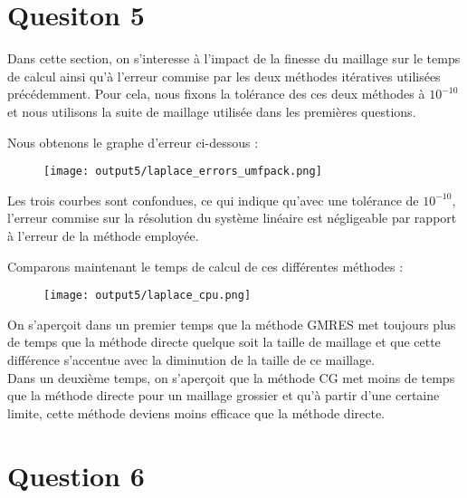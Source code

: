\documentclass[11pt,a4paper]{report}
\begin{document}
			\section*{Quesiton 5}
				
				Dans cette section, on s'interesse à l'impact de la finesse du maillage sur le temps de calcul ainsi qu'à l'erreur commise par les deux méthodes itératives utilisées précédemment.
				Pour cela, nous fixons la tolérance des ces deux méthodes à $10^{-10}$ et nous utilisons la suite de maillage utilisée dans les premières questions.

				Nous obtenons le graphe d'erreur ci-dessous :

				\begin{figure}[H]
					\centering
					\texttt{[image: output5/laplace\_errors\_umfpack.png]}
				\end{figure}

				Les trois courbes sont confondues, ce qui indique qu'avec une tolérance de $10^{-10}$, l'erreur commise sur la résolution du système linéaire est négligeable par rapport à l'erreur de la méthode employée.

				Comparons maintenant le temps de calcul de ces différentes méthodes :
				
				\begin{figure}[H]
					\centering
					\texttt{[image: output5/laplace\_cpu.png]}
				\end{figure}

				On s'aperçoit dans un premier temps que la méthode GMRES met toujours plus de temps que la méthode directe quelque soit la taille de maillage et que cette différence s'accentue avec la diminution de la taille de ce maillage.\\
				
				Dans un deuxième temps, on s'aperçoit que la méthode CG met moins de temps que la méthode directe pour un maillage grossier et qu'à partir d'une certaine limite, cette méthode deviens moins efficace que la méthode directe.
		
		\section*{Question 6}
\end{document}
